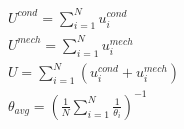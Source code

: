 \pagestyle{empty}


\begin{eqnarray*}
   U^{cond} = \displaystyle\sum_{i=1}^{N} u_{i}^{cond} \\ 
   U^{mech} = \displaystyle\sum_{i=1}^{N} u_{i}^{mech} \\
   U = \displaystyle\sum_{i=1}^{N} (u_{i}^{cond} + u_{i}^{mech}) \\
   \theta_{avg} = (\frac{1}{N}\displaystyle\sum_{i=1}^{N} \frac{1}{\theta_{i}})^{-1} \\
\end{eqnarray*}                           


